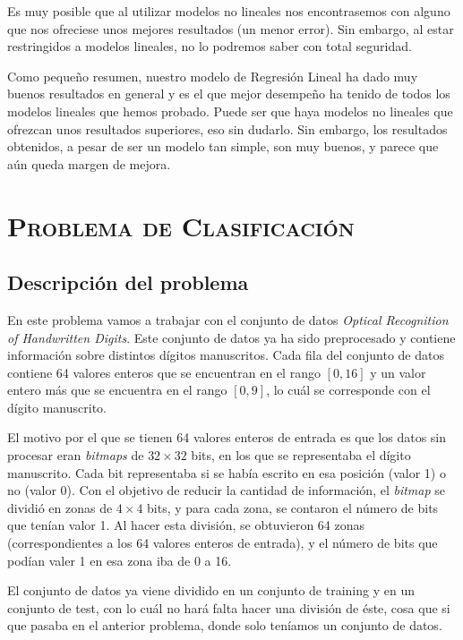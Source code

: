 \documentclass[11pt,a4paper]{article}
\begin{document}
Es muy posible que al utilizar modelos no lineales nos encontrasemos con
alguno que nos ofreciese unos mejores resultados (un menor error). Sin
embargo, al estar restringidos a modelos lineales, no lo podremos saber
con total seguridad.

Como pequeño resumen, nuestro modelo de Regresión Lineal ha dado muy
buenos resultados en general y es el que mejor desempeño ha tenido de
todos los modelos lineales que hemos probado. Puede ser que haya modelos
no lineales que ofrezcan unos resultados superiores, eso sin dudarlo.
Sin embargo, los resultados obtenidos, a pesar de ser un modelo tan
simple, son muy buenos, y parece que aún queda margen de mejora.

\newpage

\section{\textsc{Problema de Clasificación}}

\subsection{Descripción del problema}\label{descripciuxf3n-del-problema}

    En este problema vamos a trabajar con el conjunto de datos \emph{Optical
Recognition of Handwritten Digits}\cite{digits}. Este conjunto de datos ya ha sido
preprocesado y contiene información sobre distintos dígitos manuscritos.
Cada fila del conjunto de datos contiene 64 valores enteros que se
encuentran en el rango \([0, 16]\) y un valor entero más que se
encuentra en el rango \([0, 9]\), lo cuál se corresponde con el dígito
manuscrito.

El motivo por el que se tienen 64 valores enteros de entrada es que los
datos sin procesar eran \emph{bitmaps} de \(32 \times 32\) bits, en los
que se representaba el dígito manuscrito. Cada bit representaba si se
había escrito en esa posición (valor 1) o no (valor 0). Con el objetivo
de reducir la cantidad de información, el \emph{bitmap} se dividió en
zonas de \(4 \times 4\) bits, y para cada zona, se contaron el número de
bits que tenían valor 1. Al hacer esta división, se obtuvieron 64 zonas
(correspondientes a los 64 valores enteros de entrada), y el número de
bits que podían valer 1 en esa zona iba de 0 a 16.

El conjunto de datos ya viene dividido en un conjunto de training y en
un conjunto de test, con lo cuál no hará falta hacer una división de
éste, cosa que si que pasaba en el anterior problema, donde solo
teníamos un conjunto de datos.
\end{document}
